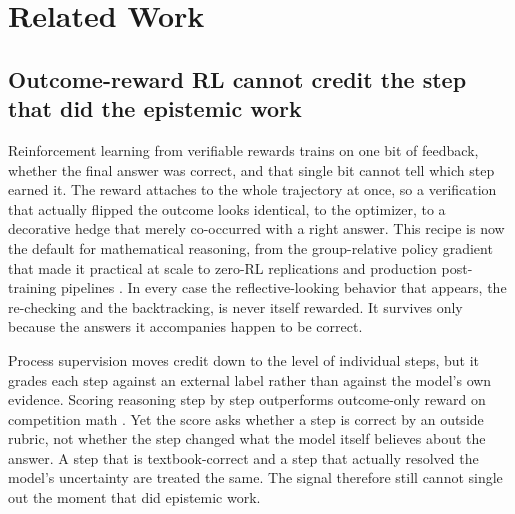 \section{Related Work}
\label{sec:related}

\subsection{Outcome-reward RL cannot credit the step that did the epistemic work}
\label{sec:related:rlvr}

Reinforcement learning from verifiable rewards trains on one bit of feedback,
whether the final answer was correct, and that single bit cannot tell which step
earned it. The reward attaches to the whole trajectory at once, so a
verification that actually flipped the outcome looks identical, to the
optimizer, to a decorative hedge that merely co-occurred with a right answer.
This recipe is now the default for mathematical reasoning, from the
group-relative policy gradient that made it practical at scale to zero-RL
replications and production post-training pipelines
\citep{shao2024deepseekmath, deepseekr1, zeng2025simplerlzoo, qwen3}. In every
case the reflective-looking behavior that appears, the re-checking and the
backtracking, is never itself rewarded. It survives only because the answers it
accompanies happen to be correct.

Process supervision moves credit down to the level of individual steps, but it
grades each step against an external label rather than against the model's own
evidence. Scoring reasoning step by step outperforms outcome-only reward on
competition math \citep{lightman2024letsverify}. Yet the score asks whether a
step is correct by an outside rubric, not whether the step changed what the
model itself believes about the answer. A step that is textbook-correct and a
step that actually resolved the model's uncertainty are treated the same. The
signal therefore still cannot single out the moment that did epistemic work.


